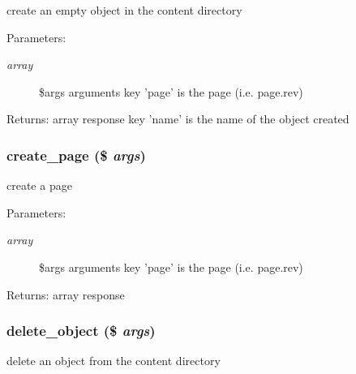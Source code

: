 create an empty object in the content directory

\begin{Desc}
\item[Parameters:]
\begin{description}
\item[{\em array}]\$args arguments key 'page' is the page (i.e. page.rev) \end{description}
\end{Desc}
\begin{Desc}
\item[Returns:]array response key 'name' is the name of the object created \end{Desc}
\hypertarget{module__glue_8inc_8php_9806cd2a9b829a24876b149753e819fb}{
\subsubsection[{create\_\-page}]{\setlength{\rightskip}{0pt plus 5cm}create\_\-page (\$ {\em args})}}
\label{module__glue_8inc_8php_9806cd2a9b829a24876b149753e819fb}


create a page

\begin{Desc}
\item[Parameters:]
\begin{description}
\item[{\em array}]\$args arguments key 'page' is the page (i.e. page.rev) \end{description}
\end{Desc}
\begin{Desc}
\item[Returns:]array response \end{Desc}
\hypertarget{module__glue_8inc_8php_51fdb1d1ff829d6d2d79a9f852b7e0ef}{
\subsubsection[{delete\_\-object}]{\setlength{\rightskip}{0pt plus 5cm}delete\_\-object (\$ {\em args})}}
\label{module__glue_8inc_8php_51fdb1d1ff829d6d2d79a9f852b7e0ef}


delete an object from the content directory

